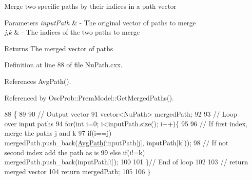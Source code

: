 Merge two specific paths by their indices in a path vector


\begin{DoxyParams}{Parameters}
{\em input\+Path} & -\/ The original vector of paths to merge \\
\hline
{\em j,k} & -\/ The indices of the two paths to merge \\
\hline
\end{DoxyParams}
\begin{DoxyReturn}{Returns}
The merged vector of paths 
\end{DoxyReturn}


Definition at line 88 of file Nu\+Path.\+cxx.



References Avg\+Path().



Referenced by Osc\+Prob\+::\+Prem\+Model\+::\+Get\+Merged\+Paths().


\begin{DoxyCode}
88                                                                                              \{
89 
90   \textcolor{comment}{// Output vector}
91   vector<NuPath> mergedPath;
92 
93   \textcolor{comment}{// Loop over input paths}
94   \textcolor{keywordflow}{for}(\textcolor{keywordtype}{int} i=0; i<inputPath.size(); i++)\{
95 
96     \textcolor{comment}{// If first index, merge the paths j and k}
97     \textcolor{keywordflow}{if}(i==j) mergedPath.push\_back(\hyperlink{namespaceOscProb_a999a7944bad8bc72d7ee9f56f81a210e}{AvgPath}(inputPath[j], inputPath[k]));
98     \textcolor{comment}{// If not second index add the path as is}
99     \textcolor{keywordflow}{else} \textcolor{keywordflow}{if}(i!=k) mergedPath.push\_back(inputPath[i]);
100 
101   \}\textcolor{comment}{// End of loop}
102 
103   \textcolor{comment}{// return merged vector}
104   \textcolor{keywordflow}{return} mergedPath;
105 
106 \}
\end{DoxyCode}

